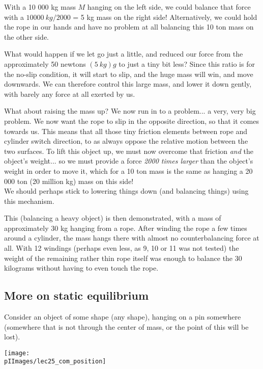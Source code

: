 With a 10 000 kg mass $M$ hanging on the left side, we could balance that force with a $\SI{10000}{kg}/2000$ = 5 kg mass on the right side! Alternatively, we could hold the rope in our hands and have no problem at all balancing this 10 ton mass on the other side.

What would happen if we let go just a little, and reduced our force from the approximately 50 newtons $(\SI{5}{kg}) g$ to just a tiny bit less? Since this ratio is for the no-slip condition, it will start to slip, and the huge mass will win, and move downwards. We can therefore control this large mass, and lower it down gently, with barely any force at all exerted by us.

What about raising the mass up? We now run in to a problem... a very, very big problem. We now want the rope to slip in the opposite direction, so that it comes towards us. This means that all those tiny friction elements between rope and cylinder switch direction, to as always oppose the relative motion between the two surfaces. To lift this object up, we must now overcome that friction \emph{and} the object's weight... so we must provide a force \emph{2000 times larger} than the object's weight in order to move it, which for a 10 ton mass is the same as hanging a 20 000 ton (20 million kg) mass on this side!\\
We should perhaps stick to lowering things down (and balancing things) using this mechanism.

This (balancing a heavy object) is then demonstrated, with a mass of approximately 30 kg hanging from a rope. After winding the rope a few times around a cylinder, the mass hangs there with almost no counterbalancing force at all. With 12 windings (perhaps even less, as 9, 10 or 11 was not tested) the weight of the remaining rather thin rope itself was enough to balance the 30 kilograms without having to even touch the rope.

\subsection{More on static equilibrium}

Consider an object of some shape (any shape), hanging on a pin somewhere (somewhere that is not through the center of mass, or the point of this will be lost).

\begin{center}
\texttt{[image: \\pIImages/lec25\_com\_position]}
\end{center}

